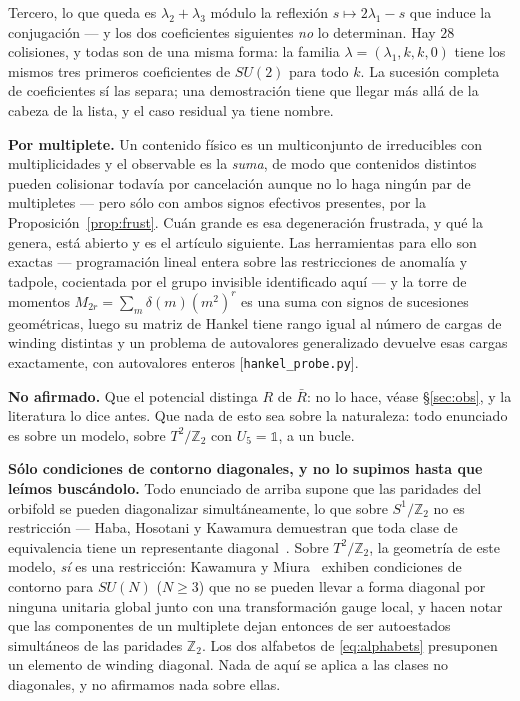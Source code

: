 \documentclass[11pt,a4paper]{article}
\newcommand{\ZZ}{\mathbb{Z}}
\newcommand{\one}{\mathds{1}}
\newcommand{\su}[1]{SU(#1)}
\begin{document}
Tercero, lo que queda es $\lambda_2+\lambda_3$ módulo la reflexión $s\mapsto2\lambda_1-s$ que induce
la conjugación --- y los dos coeficientes siguientes \emph{no} lo determinan. Hay $28$ colisiones, y
todas son de una misma forma: la familia $\lambda=(\lambda_1,k,k,0)$ tiene los mismos tres primeros
coeficientes de $SU(2)$ para todo $k$. La sucesión completa de coeficientes sí las separa; una
demostración tiene que llegar más allá de la cabeza de la lista, y el caso residual ya tiene nombre.

\textbf{Por multiplete.} Un contenido físico es un multiconjunto de irreducibles con multiplicidades
y el observable es la \emph{suma}, de modo que contenidos distintos pueden colisionar todavía por
cancelación aunque no lo haga ningún par de multipletes --- pero sólo con ambos signos efectivos
presentes, por la Proposición~\ref{prop:frust}. Cuán grande es esa degeneración frustrada, y qué la
genera, está abierto y es el artículo siguiente. Las herramientas para ello son exactas ---
programación lineal entera sobre las restricciones de anomalía y tadpole, cocientada por el grupo
invisible identificado aquí --- y la torre de momentos $M_{2r}=\sum_m\delta(m)(m^2)^r$ es una suma con
signos de sucesiones geométricas, luego su matriz de Hankel tiene rango igual al número de cargas de
winding distintas y un problema de autovalores generalizado devuelve esas cargas exactamente, con
autovalores enteros [\texttt{hankel\_probe.py}].

\textbf{No afirmado.} Que el potencial distinga $R$ de $\bar R$: no lo hace, véase \S\ref{sec:obs}, y
la literatura lo dice antes. Que nada de esto sea sobre la naturaleza: todo enunciado es sobre un
modelo, sobre $T^2/\ZZ_2$ con $U_5=\one$, a un bucle.

\textbf{Sólo condiciones de contorno diagonales, y no lo supimos hasta que leímos buscándolo.} Todo
enunciado de arriba supone que las paridades del orbifold se pueden diagonalizar simultáneamente, lo
que sobre $S^1/\ZZ_2$ no es restricción --- Haba, Hosotani y Kawamura demuestran que toda clase de
equivalencia tiene un representante diagonal~\cite{HHK}. Sobre $T^2/\ZZ_2$, la geometría de este
modelo, \emph{sí} es una restricción: Kawamura y Miura~\cite{KM} exhiben condiciones de contorno para
$\su N$ ($N\ge3$) que no se pueden llevar a forma diagonal por ninguna unitaria global junto con una
transformación gauge local, y hacen notar que las componentes de un multiplete dejan entonces de ser
autoestados simultáneos de las paridades $\ZZ_2$. Los dos alfabetos de \eqref{eq:alphabets}
presuponen un elemento de winding diagonal. Nada de aquí se aplica a las clases no diagonales, y no
afirmamos nada sobre ellas.
\end{document}
